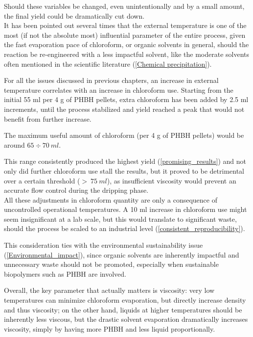 \documentclass{article}
\begin{document}
        Should these variables be changed, even unintentionally and by a small amount, the final yield
        could be dramatically cut down. \\ 

        It has been pointed out several times that the external temperature is one of the most 
        (if not the absolute most) influential parameter of the entire process, given the fast evaporation pace of chloroform, 
        or organic solvents in general, should the reaction be re-engineered with a less impactful solvent, like the moderate 
        solvents often mentioned in the scientific literature (\ref{Chemical precipitation}).  

        For all the issues discussed in previous chapters, an increase in external temperature correlates with an increase in 
        chloroform use. Starting from the initial 55 ml per 4 g of PHBH pellets, extra chloroform has been added 
        by 2.5 ml increments, until the process stabilized and yield reached a peak that would not benefit from further 
        increase. 
 
        The maximum useful amount of chloroform (per 4 g of PHBH pellets) would be around $65 \div 70 \ ml$. 

        This range consistently produced the highest yield (\ref{promising_results}) and not only did further chloroform use stall the 
        results, but it proved to be detrimental over a certain threshold ($ > \ 75 \ ml$), as insufficient 
        viscosity would prevent an accurate flow control during the dripping phase. \\ 

        All these adjustments in chloroform quantity are only a consequence of uncontrolled operational temperatures. A 10 ml 
        increase in chloroform use might seem insignificant at a lab scale, but this would translate to significant waste, 
        should the process be scaled to an industrial level (\ref{consistent_reproducibility}). 

        This consideration ties with the environmental sustainability issue (\ref{Environmental_impact}), since organic solvents are 
        inherently impactful and unnecessary waste should not be promoted, especially when sustainable biopolymers such as PHBH are involved. 

        Overall, the key parameter that actually matters is viscosity: very low temperatures can minimize chloroform evaporation, 
        but directly increase density and thus viscosity; on the other hand, liquids at higher temperatures should be inherently 
        less viscous, but the drastic solvent evaporation dramatically increases viscosity, simply by having more PHBH and less 
        liquid proportionally. \\ 
        
\end{document}
